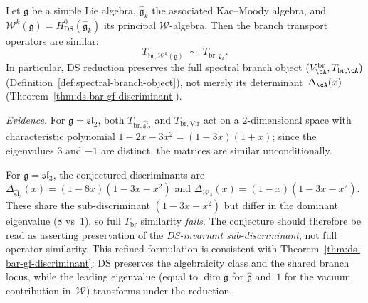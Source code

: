 \begin{conjecture}\label{conj:ds-spectral-branch-preservation}
Let $\mathfrak{g}$ be a simple Lie algebra,
$\widehat{\mathfrak{g}}_k$ the associated Kac--Moody algebra, and
$\mathcal{W}^k(\mathfrak{g}) = H^0_{\mathrm{DS}}(\widehat{\mathfrak{g}}_k)$
its principal $\mathcal{W}$-algebra.
Then the branch transport operators are similar:
\[
T_{\mathrm{br},\mathcal{W}^k(\mathfrak{g})}
\;\sim\;
T_{\mathrm{br},\widehat{\mathfrak{g}}_k}.
\]
In particular, DS reduction preserves the full spectral branch
object $(V_{\cA}^{\mathrm{br}}, T_{\mathrm{br},\cA})$
\textup{(}Definition~\textup{\ref{def:spectral-branch-object})},
not merely its determinant~$\Delta_{\cA}(x)$
\textup{(}Theorem~\textup{\ref{thm:ds-bar-gf-discriminant})}.

\emph{Evidence.}
For $\mathfrak{g} = \mathfrak{sl}_2$, both
$T_{\mathrm{br},\widehat{\mathfrak{sl}}_2}$ and
$T_{\mathrm{br},\mathrm{Vir}}$ act on a $2$-dimensional
space with characteristic polynomial $1 - 2x - 3x^2
= (1-3x)(1+x)$; since the eigenvalues $3$ and $-1$ are distinct,
the matrices are similar unconditionally.

For $\mathfrak{g} = \mathfrak{sl}_3$,
the conjectured discriminants are
$\Delta_{\widehat{\mathfrak{sl}}_3}(x) = (1-8x)(1-3x-x^2)$
and $\Delta_{\mathcal{W}_3}(x) = (1-x)(1-3x-x^2)$.
These share the sub-discriminant $(1-3x-x^2)$ but differ in
the dominant eigenvalue ($8$ vs~$1$), so full
$T_{\mathrm{br}}$ similarity \emph{fails}.  The conjecture
should therefore be read as asserting preservation of the
\emph{DS-invariant sub-discriminant}, not full operator
similarity.  This refined formulation is consistent with
Theorem~\ref{thm:ds-bar-gf-discriminant}: DS preserves the
algebraicity class and the shared branch locus, while the
leading eigenvalue (equal to $\dim\mathfrak{g}$ for
$\widehat{\mathfrak{g}}$ and~$1$ for the vacuum
contribution in~$\mathcal{W}$) transforms under the
reduction.
\end{conjecture}

